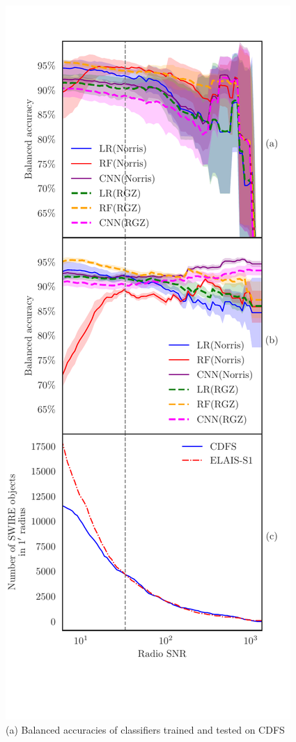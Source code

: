 \documentclass[fleqn,usenatbib,usedcolumn]{mnras}
\begin{document}
  \begin{figure}
    \centering
    \includegraphics[trim={0cm 1cm 0cm 0.5cm}, clip]{images/accuracies-flux-snr.pdf}
    \caption{(a) Balanced accuracies of classifiers trained and tested on CDFS
}
\end{figure}
\end{document}
